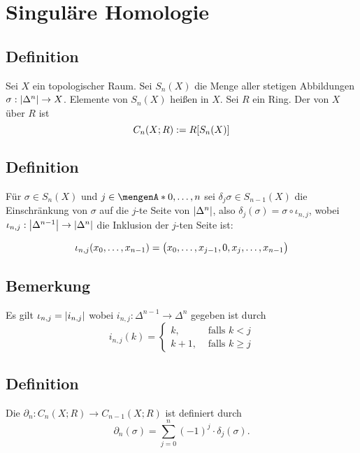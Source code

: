 \section{Singuläre Homologie} %
\label{sec:5}

\subsection[Definition: Singuläre Simplizes und $n$-ter singulärer Kettenmodul]{Definition} %
\label{sub:51}
Sei $X$ ein topologischer Raum. Sei $S_n(X)$ die Menge aller stetigen Abbildungen $\sigma : \abs*{\Delta^n} \to X$. Elemente von $S_n(X)$ heißen  
in $X$. Sei $R$ ein Ring. Der  von $X$ über $R$ ist
\[
	C_n(X;R) := R \benbrace*{S_n(X)} 
\] 


\subsection[Definition: Einschränkung eines singulären Simplizes auf eine Seite]{Definition} %
\label{sub:52}
Für $\sigma \in S_n(X)$ und $j \in \set{0,\ldots ,n}$ sei $\delta_j \sigma \in S_{n-1}(X)$ die Einschränkung von $\sigma$ auf die $j$-te Seite von $\abs*{\Delta^n}$,
also $\delta_j(\sigma) = \sigma \circ \iota_{n,j}$, wobei $\iota_{n,j} : \abs*{\Delta^{n-1}} \to \abs*{\Delta^n}$ die Inklusion der $j$-ten Seite ist:

\[
	\iota_{n,j}(x_0, \ldots ,x_{n-1}) = \enbrace[\big]{x_0, \ldots , x_{j-1}, 0, x_j, \ldots , x_{n-1}}
\]

\subsection[Bemerkung zur Inklusion der $j$-ten Seite]{Bemerkung} %
\label{sub:53}
Es gilt $\iota_{n,j} = \abs*{i_{n,j}}$ wobei $i_{n,j} : \Delta^{n-1} \to \Delta^n$ gegeben ist durch 
\[
	i_{n,j}(k) = \begin{cases}
	k, &\text{ falls }k < j\\
	k+1, &\text{ falls } k\ge j
\end{cases}
\]

\subsection[Definition: $n$-te singuläre Randabbildung]{Definition} %
\label{sub:54}
Die  $\partial_n : C_n(X;R) \to C_{n-1}(X;R)$ ist 
definiert durch 
\[
	\partial_n(\sigma) = \sum_{j=0}^{n} (-1)^j \cdot \delta_j(\sigma).
\]

